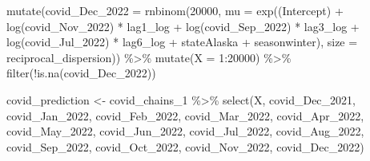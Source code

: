 \documentclass[
]{book}
\newenvironment{Shaded}{\begin{snugshade}}{\end{snugshade}}
\newcommand{\AttributeTok}[1]{\textcolor[rgb]{0.77,0.63,0.00}{#1}}
\newcommand{\DecValTok}[1]{\textcolor[rgb]{0.00,0.00,0.81}{#1}}
\newcommand{\FunctionTok}[1]{\textcolor[rgb]{0.00,0.00,0.00}{#1}}
\newcommand{\NormalTok}[1]{#1}
\newcommand{\OtherTok}[1]{\textcolor[rgb]{0.56,0.35,0.01}{#1}}
\newcommand{\SpecialCharTok}[1]{\textcolor[rgb]{0.00,0.00,0.00}{#1}}
\newcommand{\StringTok}[1]{\textcolor[rgb]{0.31,0.60,0.02}{#1}}
\begin{document}
\begin{Shaded}
\begin{Highlighting}[]
  \FunctionTok{mutate}\NormalTok{(}\AttributeTok{covid\_Dec\_2022 =} \FunctionTok{rnbinom}\NormalTok{(}\DecValTok{20000}\NormalTok{, }\AttributeTok{mu =} \FunctionTok{exp}\NormalTok{(}\StringTok{\textasciigrave{}}\AttributeTok{(Intercept)}\StringTok{\textasciigrave{}} \SpecialCharTok{+} \FunctionTok{log}\NormalTok{(covid\_Nov\_2022) }\SpecialCharTok{*}\NormalTok{ lag1\_log }\SpecialCharTok{+} \FunctionTok{log}\NormalTok{(covid\_Sep\_2022) }\SpecialCharTok{*}\NormalTok{ lag3\_log }\SpecialCharTok{+} \FunctionTok{log}\NormalTok{(covid\_Jul\_2022) }\SpecialCharTok{*}\NormalTok{ lag6\_log }\SpecialCharTok{+}\NormalTok{ stateAlaska }\SpecialCharTok{+}\NormalTok{ seasonwinter), }\AttributeTok{size =}\NormalTok{ reciprocal\_dispersion)) }\SpecialCharTok{\%\textgreater{}\%}
  \FunctionTok{mutate}\NormalTok{(}\AttributeTok{X =} \DecValTok{1}\SpecialCharTok{:}\DecValTok{20000}\NormalTok{) }\SpecialCharTok{\%\textgreater{}\%}
  \FunctionTok{filter}\NormalTok{(}\SpecialCharTok{!}\FunctionTok{is.na}\NormalTok{(covid\_Dec\_2022))}
\end{Highlighting}
\end{Shaded}

\begin{Shaded}
\begin{Highlighting}[]
\NormalTok{covid\_prediction }\OtherTok{\textless{}{-}}\NormalTok{ covid\_chains\_1 }\SpecialCharTok{\%\textgreater{}\%}
  \FunctionTok{select}\NormalTok{(X, covid\_Dec\_2021, covid\_Jan\_2022, covid\_Feb\_2022, covid\_Mar\_2022, covid\_Apr\_2022, covid\_May\_2022, covid\_Jun\_2022, covid\_Jul\_2022, covid\_Aug\_2022, covid\_Sep\_2022, covid\_Oct\_2022, covid\_Nov\_2022, covid\_Dec\_2022)}
\end{Highlighting}
\end{Shaded}
\end{document}
